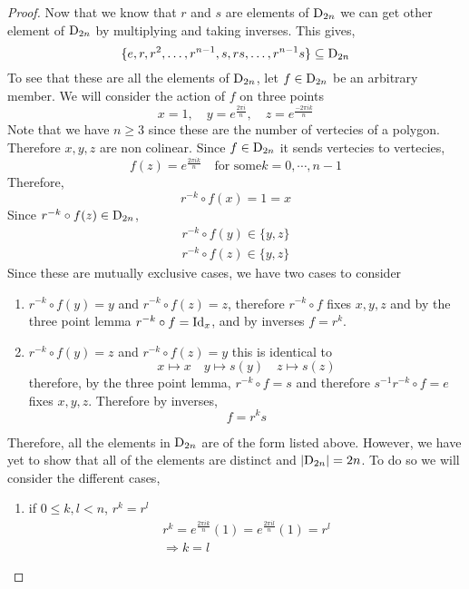 \documentclass{article}
\begin{document}
\begin{proof}
    Now that we know that $r$ and $s$ are elements of $\mathrm{D}_{2n}$ we can get other element of $\mathrm{D}_{2n}$ by multiplying and taking inverses. This gives,
    \[
        \{e, r, r^2, \ldots, r^{n-1}, s, rs, \ldots, r^{n-1}s\} \subseteq \mathrm{D}_{2n}    
    \]
    To see that these are all the elements of $\mathrm{D}_{2n}$, let $f \in \mathrm{D}_{2n}$ be an arbitrary member. We will consider the action of $f$ on three points
    \[
        x = 1, \quad y = e^\frac{2\pi i}{n}, \quad z = e^\frac{-2\pi i k}{n}
    \]
    Note that we have $n \geq 3$ since these are the number of vertecies of a polygon. Therefore $x, y, z$ are non colinear. Since $f \in \mathrm{D}_{2n}$ it sends vertecies to vertecies, 
    \[
        f(z) = e^\frac{2\pi i k}{n} \quad \text{for some} k = 0, \cdots, n-1
    \]
    Therefore,
    \[
        r^{-k}\circ f(x) = 1 = x  
    \]
    Since $r^{-k}\circ f(z) \in \mathrm{D}_{2n}$,
    \begin{align*}
        r^{-k}\circ f(y) \in \{y, z\} \\
        r^{-k}\circ f(z) \in \{y, z\}
    \end{align*}
    Since these are mutually exclusive cases, we have two cases to consider
    \begin{enumerate}[cases]
        \item $r^{-k}\circ f(y) = y$ and $r^{-k}\circ f(z) = z$, therefore $r^{-k}\circ f$ fixes $x, y, z$ and by the three point lemma $ r^{-k}\circ f = \mathrm{Id}_x$, and by inverses $f = r^k$.
        \item $r^{-k}\circ f(y) = z$ and $r^{-k}\circ f(z) = y$ this is identical to
        \[
            x \mapsto x \quad y \mapsto s(y) \quad z \mapsto s(z)    
        \]
        therefore, by the three point lemma, $r^{-k}\circ f = s$ and therefore $s^{-1}r^{-k}\circ f = e$ fixes $x, y, z$. Therefore by inverses,
        \[
            f = r^ks  
        \]
    \end{enumerate}
    Therefore, all the elements in $\mathrm{D}_{2n}$ are of the form listed above. However, we have yet to show that all of the elements are distinct and $\left\lvert \mathrm{D}_{2n}\right\rvert = 2n$. To do so we will consider the different cases,
    \begin{enumerate}[cases]
        \item if $0 \leq k, l < n$, $r^k = r^l$
        \begin{align*}
            r^k = e^\frac{2\pi i k}{n}(1) = e^\frac{2\pi i l}{n}(1) = r^l \\
            \Rightarrow k = l
        \end{align*}


\end{enumerate}
\end{proof}
\end{document}
